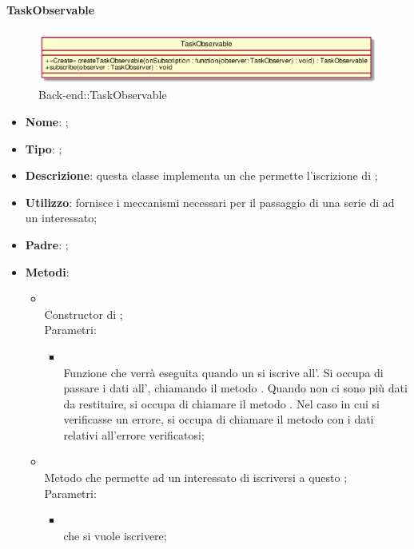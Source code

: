 \hypertarget{TaskObservable_label}{\paragraph{TaskObservable}}
\begin{figure}[h]
	\centering
	\includegraphics[width=\textwidth,height=\textheight,keepaspectratio]{images/ClassTaskObservable.png}
	\caption{Back-end::TaskObservable}
\end{figure}
\begin{itemize}
	\item \textbf{Nome}: ;
	\item \textbf{Tipo}: ;
	\item \textbf{Descrizione}: questa classe implementa un  che permette l'iscrizione di ;
	\item \textbf{Utilizzo}: fornisce i meccanismi necessari per il passaggio di una serie di  ad un  interessato;
	\item \textbf{Padre}: ;
	\item \textbf{Metodi}:
	\begin{itemize}
		\item[]  \\
		Constructor di ;\\
		Parametri:
		\begin{itemize}
			\item {} \\
			Funzione che verrà eseguita quando un  si iscrive all'. Si occupa di passare i dati all', chiamando il metodo . Quando non ci sono più dati da restituire, si occupa di chiamare il metodo . Nel caso in cui si verificasse un errore, si occupa di chiamare il metodo  con i dati relativi all'errore verificatosi;
		\end{itemize}
		\item[]  \\
		Metodo che permette ad un  interessato di iscriversi a questo ;\\
		Parametri:
		\begin{itemize}
			\item {} \\
			 che si vuole iscrivere;
		\end{itemize}
	\end{itemize}
\end{itemize}
\FloatBarrier

